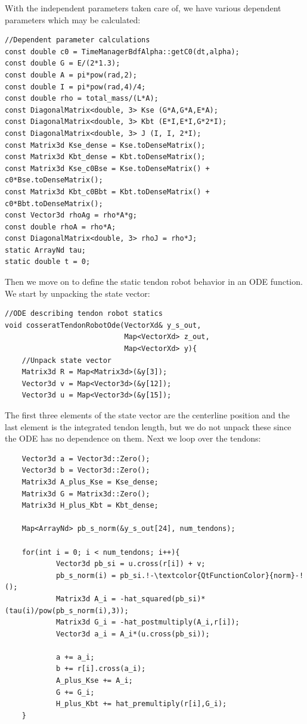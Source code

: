 \documentclass[12pt]{article}
\begin{document}
\newpage \noindent
With the independent parameters taken care of, we have various dependent parameters which may be calculated:
\begin{lstlisting}
//Dependent parameter calculations
const double c0 = TimeManagerBdfAlpha::getC0(dt,alpha);
const double G = E/(2*1.3);
const double A = pi*pow(rad,2);
const double I = pi*pow(rad,4)/4;
const double rho = total_mass/(L*A);
const DiagonalMatrix<double, 3> Kse (G*A,G*A,E*A);
const DiagonalMatrix<double, 3> Kbt (E*I,E*I,G*2*I);
const DiagonalMatrix<double, 3> J (I, I, 2*I);
const Matrix3d Kse_dense = Kse.toDenseMatrix();
const Matrix3d Kbt_dense = Kbt.toDenseMatrix();
const Matrix3d Kse_c0Bse = Kse.toDenseMatrix() + c0*Bse.toDenseMatrix();
const Matrix3d Kbt_c0Bbt = Kbt.toDenseMatrix() + c0*Bbt.toDenseMatrix();
const Vector3d rhoAg = rho*A*g;
const double rhoA = rho*A;
const DiagonalMatrix<double, 3> rhoJ = rho*J;
static ArrayNd tau;
static double t = 0;
\end{lstlisting}
Then we move on to define the static tendon robot behavior in an ODE function. We start by unpacking the state vector:
\begin{lstlisting}
//ODE describing tendon robot statics
void cosseratTendonRobotOde(VectorXd& y_s_out,
                            Map<VectorXd> z_out,
                            Map<VectorXd> y){
    //Unpack state vector
    Matrix3d R = Map<Matrix3d>(&y[3]);
    Vector3d v = Map<Vector3d>(&y[12]);
    Vector3d u = Map<Vector3d>(&y[15]);
\end{lstlisting}
The first three elements of the state vector are the centerline position and the last element is the integrated tendon length, but we do not unpack these since the ODE has no dependence on them. Next we loop over the tendons:
\begin{lstlisting}
	Vector3d a = Vector3d::Zero();
	Vector3d b = Vector3d::Zero();
	Matrix3d A_plus_Kse = Kse_dense;
	Matrix3d G = Matrix3d::Zero();
	Matrix3d H_plus_Kbt = Kbt_dense;

	Map<ArrayNd> pb_s_norm(&y_s_out[24], num_tendons);

	for(int i = 0; i < num_tendons; i++){
			Vector3d pb_si = u.cross(r[i]) + v;
			pb_s_norm(i) = pb_si.!-\textcolor{QtFunctionColor}{norm}-!();
			Matrix3d A_i = -hat_squared(pb_si)*(tau(i)/pow(pb_s_norm(i),3));
			Matrix3d G_i = -hat_postmultiply(A_i,r[i]);
			Vector3d a_i = A_i*(u.cross(pb_si));

			a += a_i;
			b += r[i].cross(a_i);
			A_plus_Kse += A_i;
			G += G_i;
			H_plus_Kbt += hat_premultiply(r[i],G_i);
	}
\end{lstlisting}
\end{document}
